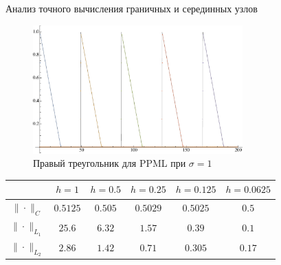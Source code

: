 \documentclass[unicode, 8pt]{beamer}
\begin{document}
    \begin{frame}{Анализ точного вычисления граничных и серединных узлов}
        \begin{figure}[h]
            \centering
            \includegraphics[width=0.72\textwidth]{sigma=1./advectionPPML_rightTriangle.pdf}
            \caption{Правый треугольник для PPML при $ \sigma = 1 $}
            \label{fig:ppml_rightTriangle_1}
        \end{figure}
        \begin{center}
            \begin{tabular}{ |c|c|c|c|c|c| } 
             \hline
            & $ h=1 $ &  $ h=0.5$ &  $ h=0.25 $ &  $ h=0.125 $ &  $ h=0.0625 $ \\ 
             \hline 
             $\| \cdot \|_{C}$ & $0.5125$ & $0.505$ & $0.5029$ & $0.5025$ & $0.5$
             \\
             \hline
             $\| \cdot \|_{L_1}$ & $25.6$ & $6.32$ & $1.57$ & $0.39$ & $0.1$
             \\
             \hline
             $\| \cdot \|_{L_2}$ & $2.86$ & $1.42$ & $0.71$ & $0.305$ & $0.17$
             \\
             \hline
            \end{tabular}
        \end{center}
    \end{frame}
\end{document}
